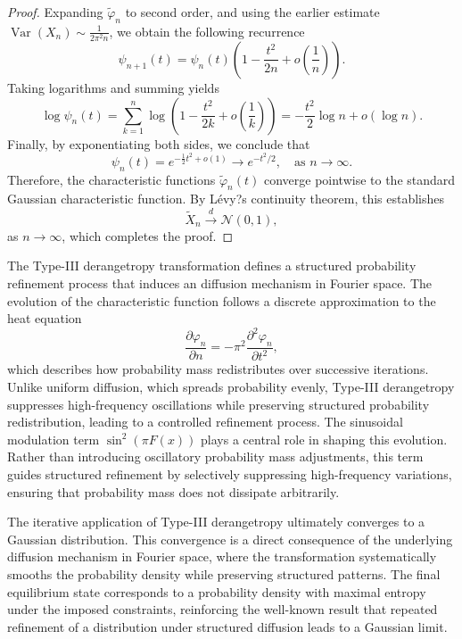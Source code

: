\documentclass[sn-mathphys-num]{sn-jnl}%
\theoremstyle{thmstyleone}%
\theoremstyle{thmstyletwo}%
\theoremstyle{thmstylethree}%
\begin{document}
\begin{proof}
	Expanding \( \widetilde{\varphi}_n \) to second order, and using the earlier estimate \( \operatorname{Var}(X_n) \sim \frac{1}{2\pi^2 n} \), we obtain the following recurrence
	\begin{equation}
		\psi_{n+1}(t) = \psi_n(t) \left(1 - \frac{t^2}{2n} + o\left(\frac{1}{n}\right) \right).
	\end{equation}
	Taking logarithms and summing yields
	\begin{equation}
		\log \psi_n(t) = \sum_{k=1}^n \log \left(1 - \frac{t^2}{2k} + o\left(\frac{1}{k} \right) \right) = -\frac{t^2}{2} \log n + o(\log n).
	\end{equation}
	Finally, by exponentiating both sides, we conclude that
	\begin{equation}
		\psi_n(t) = e^{ -\frac{1}{2}t^2 + o(1) } \longrightarrow e^{-t^2/2}, \quad \text{as } n \to \infty.
	\end{equation}
	Therefore, the characteristic functions \( \widetilde{\varphi}_n(t) \) converge pointwise to the standard Gaussian characteristic function. By L\'evy?s continuity theorem, this establishes
	\begin{equation}
		\widetilde{X}_n \xrightarrow{d} \mathcal{N}(0,1),
	\end{equation}
	as \( n \to \infty \), which completes the proof.
\end{proof}

The Type-III derangetropy transformation defines a structured probability refinement process that induces an diffusion mechanism in Fourier space. The evolution of the characteristic function follows a discrete approximation to the heat equation
\begin{equation}
	\frac{\partial \varphi_n}{\partial n}=-\pi^2 \frac{\partial^2 \varphi_n}{\partial t^2},
\end{equation}
which describes how probability mass redistributes over successive iterations. Unlike uniform diffusion, which spreads probability evenly, Type-III derangetropy suppresses high-frequency oscillations while preserving structured probability redistribution, leading to a controlled refinement process. The sinusoidal modulation term $\sin ^2(\pi F(x))$ plays a central role in shaping this evolution. Rather than introducing oscillatory probability mass adjustments, this term guides structured refinement by selectively suppressing high-frequency variations, ensuring that probability mass does not dissipate arbitrarily.

The iterative application of Type-III derangetropy ultimately converges to a Gaussian distribution. This convergence is a direct consequence of the underlying diffusion mechanism in Fourier space, where the transformation systematically smooths the probability density while preserving structured patterns. The final equilibrium state corresponds to a probability density with maximal entropy under the imposed constraints, reinforcing the well-known result that repeated refinement of a distribution under structured diffusion leads to a Gaussian limit.
\end{document}
